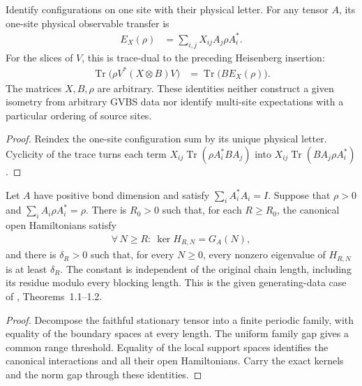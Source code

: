 \begin{lemma}
    \label{thm:supplied_isometry_insertion_trace_duality}
    \leanok
    Identify configurations on one site with their physical letter. For
    any tensor $A$, its one-site physical observable transfer is
    \begin{align}
        E_X(\rho) & =\sum_{i,j}X_{ij}A_j\rho A_i^*.
    \end{align}
    For the slices of $V$, this is trace-dual to the preceding Heisenberg
    insertion:
    \begin{align}
        \operatorname{Tr}\bigl(\rho V^*(X\otimes B)V\bigr)
         & =\operatorname{Tr}\bigl(B E_X(\rho)\bigr).
    \end{align}
    The matrices $X,B,\rho$ are arbitrary. These identities neither
    construct a given isometry from arbitrary GVBS data nor identify
    multi-site expectations with a particular ordering of source sites.
\end{lemma}
\begin{proof}\leanok
    Reindex the one-site configuration sum by its unique physical letter.
    Cyclicity of the trace turns each term
    $X_{ij}\operatorname{Tr}(\rho A_i^*BA_j)$ into
    $X_{ij}\operatorname{Tr}(BA_j\rho A_i^*)$.
\end{proof}

\begin{lemma}
    \label{thm:faithful_generators_uniform_open_gap}
    \leanok
    Let $A$ have positive bond dimension and satisfy
    $\sum_i A_i^*A_i=I$. Suppose that $\rho>0$ and
    $\sum_i A_i\rho A_i^*=\rho$. There is $R_0>0$ such that, for each
    $R\geq R_0$, the canonical open Hamiltonians satisfy
    \begin{align}
        \forall\,N\geq R:\ \ker H_{R,N}=G_A(N),
    \end{align}
    and there is $\delta_R>0$ such that, for every $N\geq0$, every
    nonzero eigenvalue of $H_{R,N}$ is at least $\delta_R$.
    The constant is independent of the original chain length, including its
    residue modulo every blocking length. This is the given generating-data
    case of \cite{Nachtergaele1996Spectral}, Theorems~1.1--1.2.
\end{lemma}
\begin{proof}\leanok
    Decompose the faithful stationary tensor into a finite periodic family,
    with equality of the boundary spaces at every length. The uniform family
    gap gives a common range threshold. Equality of the local support spaces
    identifies the canonical interactions and all their open Hamiltonians.
    Carry the exact kernels and the norm gap through these identities.
\end{proof}

